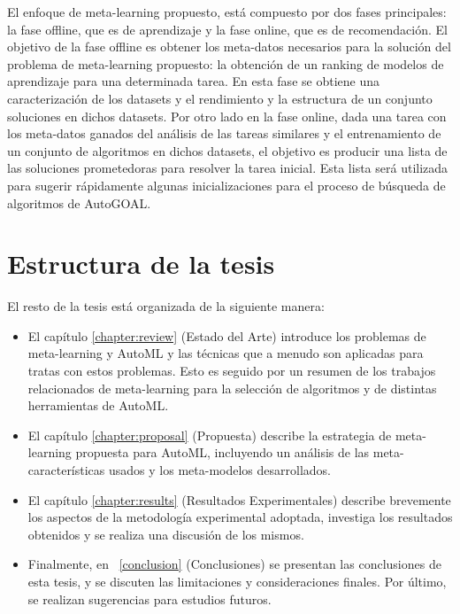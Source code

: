 El enfoque de meta-learning propuesto, está compuesto por dos fases principales: la fase offline, que es de aprendizaje y la fase online, que es de recomendación. El objetivo de la fase offline es obtener los meta-datos necesarios para la solución del problema de meta-learning propuesto: la obtención de un ranking de modelos de aprendizaje para una determinada tarea. En esta fase se obtiene una caracterización de los datasets y el rendimiento y la estructura de un conjunto soluciones en dichos datasets. Por otro lado en la fase online, dada una tarea con los meta-datos ganados del análisis de las tareas similares y el entrenamiento de un conjunto de algoritmos en dichos datasets, el objetivo es producir una lista de las soluciones prometedoras para resolver la tarea inicial. Esta lista será utilizada para sugerir rápidamente algunas inicializaciones para el proceso de búsqueda de algoritmos de AutoGOAL.



\section*{Estructura de la tesis}

El resto de la tesis está organizada de la siguiente manera:

\begin{itemize}
	\item El capítulo \ref{chapter:review} (Estado del Arte) introduce los problemas de meta-learning y AutoML y las técnicas que a menudo son aplicadas para tratas con estos problemas. Esto es seguido por un resumen de los trabajos relacionados de meta-learning para la selección de algoritmos y de distintas herramientas de AutoML.
	\item El capítulo \ref{chapter:proposal} (Propuesta) describe la estrategia de meta-learning propuesta para AutoML, incluyendo un análisis de las meta-características usados y los meta-modelos desarrollados.
	\item El capítulo \ref{chapter:results} (Resultados Experimentales) describe brevemente los aspectos de la metodología experimental adoptada, investiga los resultados obtenidos y se realiza una discusión de los mismos.
	\item Finalmente, en ~\ref{conclusion} (Conclusiones) se presentan las conclusiones de esta tesis, y se discuten las limitaciones y consideraciones finales. Por último, se realizan sugerencias para estudios futuros.
\end{itemize}